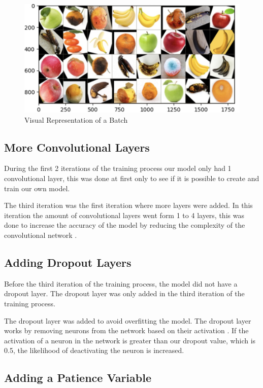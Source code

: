 \documentclass[conference]{IEEEtran}
\begin{document}
\begin{figure}[h]
    \centering
    \includegraphics[width=\linewidth]{Batch_Representation.jpg}
    \caption{Visual Representation of a Batch}
    \label{fig4}
\end{figure}

\subsection{More Convolutional Layers}

During the first 2 iterations of the training process our model only had 1 convolutional layer, this was done at first only to see if it is possible to create and train our own model. 

The third iteration was the first iteration where more layers were added. In this iteration the amount of convolutional layers went form 1 to 4 layers, this was done to increase the accuracy of the model by reducing the complexity of the convolutional network \cite{b3}.

\subsection{Adding Dropout Layers}

Before the third iteration of the training process, the model did not have a dropout layer. The dropout layer was only added in the third iteration of the training process.

The dropout layer was added to avoid overfitting the model. The dropout layer works by removing neurons from the network based on their activation \cite{b5}. If the activation of a neuron in the network is greater than our dropout value, which is 0.5, the likelihood of deactivating the neuron is increased.

\subsection{Adding a Patience Variable}
\end{document}
